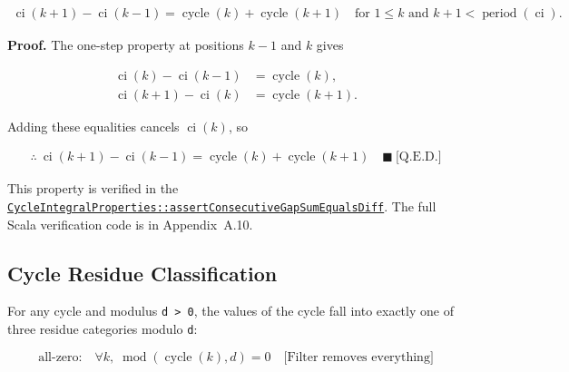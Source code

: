 \begin{equation*}
\begin{aligned}
\operatorname{ci}(k + 1) - \operatorname{ci}(k - 1) = \operatorname{cycle}(k) + \operatorname{cycle}(k + 1)
\quad \text{for } 1 \leq k \text{ and } k + 1 < \operatorname{period}(\operatorname{ci}).
\end{aligned}
\end{equation*}

\textbf{Proof.} The one-step property at positions $k-1$ and $k$ gives

\begin{equation*}
\begin{aligned}
\operatorname{ci}(k) - \operatorname{ci}(k-1) &= \operatorname{cycle}(k), \\
\operatorname{ci}(k+1) - \operatorname{ci}(k) &= \operatorname{cycle}(k+1).
\end{aligned}
\end{equation*}

Adding these equalities cancels $\operatorname{ci}(k)$, so

\begin{equation*}
\begin{aligned}
\therefore\ \operatorname{ci}(k+1) - \operatorname{ci}(k-1)
= \operatorname{cycle}(k) + \operatorname{cycle}(k+1)
\quad \blacksquare\ \text{[Q.E.D.]}
\end{aligned}
\end{equation*}

{\raggedright
This property is verified in the
\href{https://github.com/thiagomata/prime-numbers/blob/integral-cycle-article-v1.0.0/src/main/scala/v1/chapter4/cycle/integral/recursive/properties/CycleIntegralProperties.scala}{\texttt{CycleIntegralProperties::\allowbreak assertConsecutiveGapSumEqualsDiff}}.
The full Scala verification code is in Appendix~A.10.
\par}

\subsection{Cycle Residue Classification}

For any cycle and modulus \texttt{d > 0}, the values of the cycle fall into
exactly one of three residue categories modulo \texttt{d}:

\begin{equation*}
\text{all-zero:} \quad \forall k,\; \operatorname{mod}(\operatorname{cycle}(k), d) = 0
  \quad \text{[Filter removes everything]}
\end{equation*}

